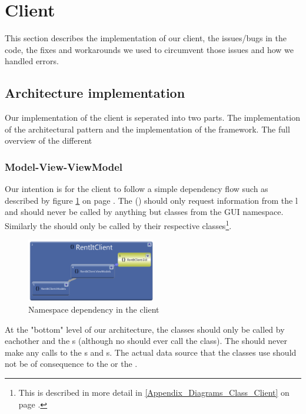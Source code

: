 \section{Client}
\label{Implementation_Client}
This section describes the implementation of our client, the issues/bugs in the code, the fixes and workarounds we used to circumvent those issues and how we handled errors.
\subsection{Architecture implementation}
\label{Implementation_Client_Architecture}
Our implementation of the client is seperated into two parts. The implementation of the  architectural pattern and the implementation of the  framework. The full overview of the different 
\subsubsection{Model-View-ViewModel}
\label{Implementation_Client_Architecture_MVVM}
Our intention is for the client to follow a simple dependency flow such as described by figure \ref{fig:Implementation_Client_Architecture_MVVM_Namespace} on page \pageref{fig:Implementation_Client_Architecture_MVVM_Namespace}. The  () should only request information from the l and should never be called by anything but classes from the GUI namespace. Similarly the  should only be called by their respective  classes\footnote{This is described in more detail in \ref{Appendix_Diagrams_Class_Client} on page \pageref{Appendix_Diagrams_Class_Client}.}. 
\begin{figure}[h!]
  \centering
    \includegraphics[width=0.5\textwidth]{Parts/Images/Implementation/NamespaceDependency}
  \caption{Namespace dependency in the client}
\label{fig:Implementation_Client_Architecture_MVVM_Namespace}
\end{figure}

At the "bottom" level of our architecture, the  classes should only be called by eachother and the s (although no  should ever call the  class). The  should never make any calls to the s and s. The actual data source that the  classes use should not be of consequence to the  or the . 

